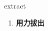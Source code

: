 
\begin{frame}
{\huge extract}
\begin{center}
\begin{enumerate}\Large
  \item \textbf{用力拔出}
\end{enumerate}
\end{center}
\end{frame}
